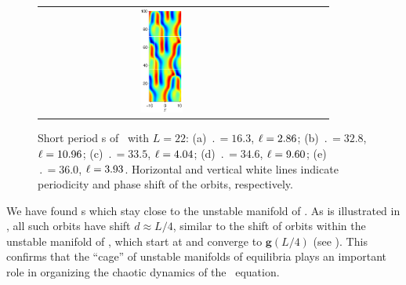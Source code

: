 \begin{figure}[t]
\begin{center}
\begin{tabular}{ccccc}
\includegraphics[width=0.18\textwidth]{figs/ks22rpo036.0-03.93.eps}
\end{tabular}
\end{center}
\caption{Short period \rpo s of \KSe\ with $L = 22$: 
(a) $\period{} = 16.3$, $\ell = 2.86$; 
(b) $\period{} = 32.8$, $\ell = 10.96$; 
(c) $\period{} = 33.5$, $\ell = 4.04$; 
(d) $\period{} = 34.6$, $\ell = 9.60$; 
(e) $\period{} = 36.0$, $\ell = 3.93$. 
Horizontal and vertical white lines indicate periodicity and phase 
shift of the orbits, respectively.
}\label{f:ks22rposShort}
\end{figure}


We have found  \rpo s which stay 
 close to the unstable 
manifold of .  
As is illustrated in , all such orbits have
shift $d \approx L/4$, similar to the shift of orbits within the
unstable manifold of , which start at  and converge
to $\mathbf{g}(L/4)$ (see ).
This confirms that the ``cage'' of unstable manifolds of equilibria 
plays an important role in organizing the chaotic dynamics of 
the \KS\ equation.

